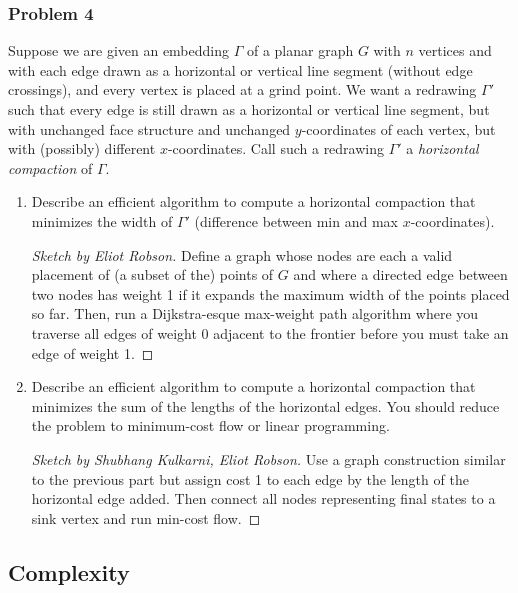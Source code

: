 \documentclass{article}
\newenvironment{sketch}[1]{\begin{proof}[Sketch by #1]}{\end{proof}}
\begin{document}
\subsubsection{Problem 4}
Suppose we are given an embedding \(\Gamma\) of a planar graph \(G\) with \(n\) vertices and with each edge drawn as a horizontal or vertical line segment (without edge crossings), and every vertex is placed at a grind point. We want a redrawing \(\Gamma'\) such that every edge is still drawn as a horizontal or vertical line segment, but with unchanged face structure and unchanged \(y\)-coordinates of each vertex, but with (possibly) different \(x\)-coordinates. Call such a redrawing \(\Gamma'\) a \emph{horizontal compaction} of \(\Gamma\).

\begin{enumerate}
    \item Describe an efficient algorithm to compute a horizontal compaction that minimizes the width of \(\Gamma'\) (difference between min and max \(x\)-coordinates).
    
    \begin{sketch}{Eliot Robson}
        Define a graph whose nodes are each a valid placement of (a subset of the) points of \(G\) and where a directed edge between two nodes has weight 1 if it expands the maximum width of the points placed so far. Then, run a Dijkstra-esque max-weight path algorithm where you traverse all edges of weight 0 adjacent to the frontier before you must take an edge of weight 1.
    \end{sketch}

    \item Describe an efficient algorithm to compute a horizontal compaction that minimizes the sum of the lengths of the horizontal edges. You should reduce the problem to minimum-cost flow or linear programming.
    
    \begin{sketch}{Shubhang Kulkarni, Eliot Robson}
        Use a graph construction similar to the previous part but assign cost 1 to each edge by the length of the horizontal edge added. Then connect all nodes representing final states to a sink vertex and run min-cost flow.
    \end{sketch}
\end{enumerate}

\subsection{Complexity}
\end{document}
